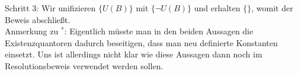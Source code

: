 \documentclass[a4paper]{article}
\begin{document}
Schritt 3: Wir unifizieren $\{ U(B)\}$ mit $\{\neg U(B)\}$ und erhalten $\{ \}$, womit der Beweis abschlie{\ss}t.\\

Anmerkung zu $^\ast$: Eigentlich m\"usste man in den beiden Aussagen die Existenzquantoren dadurch beseitigen, dass man neu definierte Konstanten einsetzt. Uns ist allerdings nicht klar wie diese Aussagen dann noch im Resolutionsbeweis verwendet werden sollen.
\end{document}
